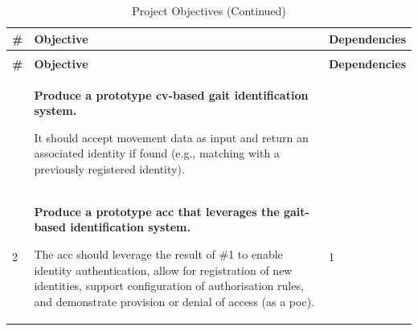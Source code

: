 \begin{scriptsize}
    \begin{longtable}[c]{|p{}|p{}|p{}|}
        \caption{Project Objectives}
        \label{tab:project-objectives}                                                                                                                                                                                                                                                                                                                                                 \\
        \hline
        \textbf{\#} & \textbf{Objective}                                                                                                                                                                                                                                                                                                                       & \textbf{Dependencies} \\ \hline
        \endfirsthead
        \caption*{Project Objectives (Continued)}                                                                                                                                                                                                                                                                                                                                      \\
        \hline
        \textbf{\#} & \textbf{Objective}                                                                                                                                                                                                                                                                                                                       & \textbf{Dependencies} \\ \hline
        \endhead
        \hline
        \endfoot
        1           & \textbf{Produce a prototype \ac{cv}-based gait identification system.} \par It should accept movement data as input and return an associated identity if found (e.g., matching with a previously registered identity).                                                                                                                   &                       \\
        2           & \textbf{Produce a prototype \ac{acc} that leverages the gait-based identification system.} \par The \ac{acc} should leverage the result of \#1 to enable identity authentication, allow for registration of new identities, support configuration of authorisation rules, and demonstrate provision or denial of access (as a \ac{poc}). & 1                     \\ \hline

\end{longtable}
\end{scriptsize}
